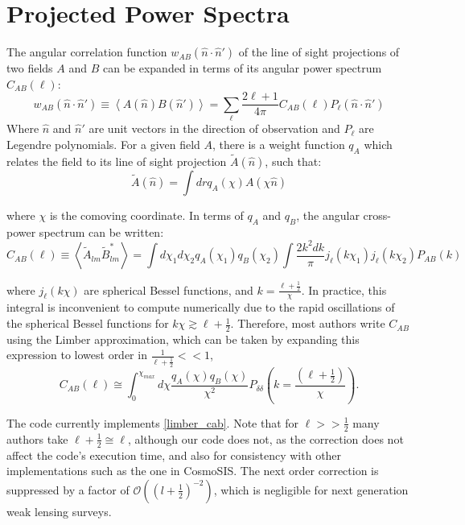\documentclass[a4paper,11pt]{article}
\begin{document}
\section{Projected Power Spectra}\label{projected_power}
The angular correlation function $w_{AB}(\hat{n}\cdot\hat{n}')$ of the line of sight projections of two fields $A$ and $B$ can be expanded in terms of its angular power spectrum $C_{AB}\left(\ell\right)$\cite{extended_limber}:
\begin{equation}
w_{AB}(\hat{n}\cdot\hat{n}')\equiv\left<A(\hat{n})B(\hat{n}')\right>=\sum_{\ell}{\frac{2\ell+1}{4\pi}C_{AB}(\ell)P_\ell(\hat{n}\cdot\hat{n}')}
\end{equation}
Where $\hat{n}$ and $\hat{n}'$ are unit vectors in the direction of observation and $P_\ell$ are  Legendre polynomials. For a given field $A$, there is a weight function $q_A$ which relates the field to its line of sight projection $\tilde{A}(\hat{n})$, such that\cite{extended_limber}:
\begin{equation}
\tilde{A}(\hat{n}) = \int{dr q_A(\chi)A(\chi\hat{n})}
\end{equation}

where $\chi$ is the comoving coordinate. In terms of $q_A$ and $q_B$, the angular cross-power spectrum can be written:
\begin{equation}\label{no limber}
C_{AB}(\ell)\equiv\left<\tilde{A}_{lm}\tilde{B}_{lm}^*\right>=\int{d\chi_1 d\chi_2 q_A(\chi_1)q_B(\chi_2)\int{\frac{2 k^2 dk}{\pi} j_\ell(k \chi_1)j_\ell(k \chi_2)P_{AB}(k)}}
\end{equation}

where $j_\ell(k\chi)$ are spherical Bessel functions, and $k=\frac{\ell+\frac{1}{2}}{\chi}$. In practice, this integral is inconvenient to compute numerically due to the rapid oscillations of the spherical Bessel functions for $k\chi\gtrsim \ell+\frac{1}{2}$. Therefore, most authors write $C_{AB}$ using the Limber approximation, which can be taken by expanding this expression to lowest order in $\frac{1}{\ell+\frac{1}{2}}<<1$,
\begin{equation}\label{limber_cab}
C_{AB}(\ell)\cong\int_{0}^{\chi_{max}}{d\chi \frac{q_A(\chi)q_B(\chi)}{\chi^2}P_{\delta\delta}\left(k=\frac{(\ell+\frac{1}{2})}{\chi}\right)}.
\end{equation}

The code currently implements \eqref{limber_cab}. Note that for $\ell>>\frac{1}{2}$ many authors take $\ell+\frac{1}{2}\cong\ell$, although our code does not, as the correction does not affect the code's execution time, and also for consistency with other implementations such as the one in CosmoSIS\cite{cosmosis}. The next order correction is suppressed by a factor of $\mathcal{O}((l+\frac{1}{2})^{-2})$, which is negligible for next generation weak lensing surveys. 
\end{document}
